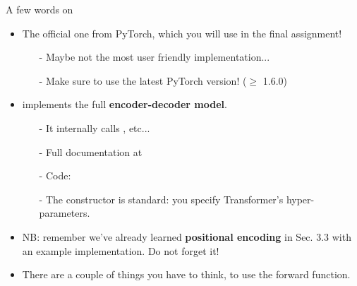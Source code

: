 \begin{frame}[fragile]{A few words on }
\begin{itemize}
\item The official one from PyTorch, which you will use in the final assignment!
\begin{itemize}
\item[-] Maybe not the most user friendly implementation...
\item[-] Make sure to use the latest PyTorch version! ($\geq$ 1.6.0)
\end{itemize}
\item {} implements the full \textbf{encoder-decoder model}.
\begin{itemize}
\item[-] It internally calls , etc...
\item[-] Full documentation at 
\item[-] Code: 
\item[-] The constructor is standard: you specify Transformer's hyper-parameters.
\end{itemize}
\item NB: remember we've already learned \textbf{positional encoding} in  Sec. 3.3 with an example implementation. \alert{Do not forget it!}
\item There are a couple of things you have to think, to use the forward function. 
\end{itemize}
\end{frame}

